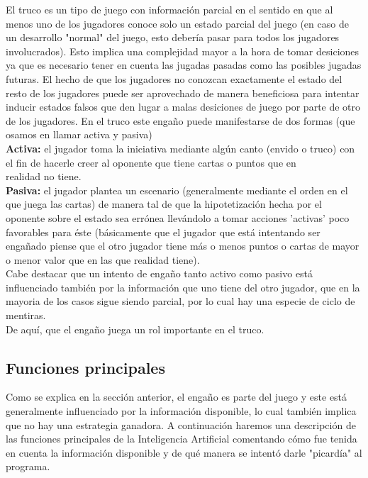 \documentclass[12pt,a4paper]{article}
\begin{document}
El truco es un tipo de juego con informaci\'on parcial en el sentido en que al menos uno de los jugadores
conoce solo un estado parcial del juego (en caso de un desarrollo "normal" del juego, esto deber\'ia 
pasar para todos los jugadores involucrados). Esto implica una complejidad mayor a la hora de tomar desiciones
ya que es necesario tener en cuenta las jugadas pasadas como las posibles jugadas futuras. 
El hecho de que los jugadores no conozcan exactamente el estado del resto de los jugadores puede ser aprovechado
de manera beneficiosa para intentar inducir estados falsos que den lugar a malas desiciones de juego 
por parte de otro de los jugadores. En el truco este enga\~no puede manifestarse de dos formas (que osamos en llamar
activa y pasiva)\\
\textbf{Activa:} el jugador toma la iniciativa mediante alg\'un canto (envido o truco) con el fin de hacerle creer al oponente que tiene
cartas o puntos que en \\ realidad no tiene.\\
\textbf{Pasiva:} el jugador plantea un escenario (generalmente mediante el orden en el que juega las cartas) de manera tal de que 
la hipotetizaci\'on hecha por el oponente sobre el estado sea err\'onea llev\'andolo a tomar acciones 'activas' poco favorables para 
\'este (b\'asicamente que el jugador que est\'a intentando ser enga\~nado piense que el otro jugador tiene m\'as o menos puntos o cartas de 
mayor o menor valor que en las que realidad tiene).\\
Cabe destacar que un intento de enga\~no tanto activo como pasivo est\'a influenciado tambi\'en por la informaci\'on que uno tiene del otro jugador,
que en la mayoria de los casos sigue siendo parcial,  por lo cual hay una especie de ciclo de mentiras.\\
De aqu\'i, que el enga\~no juega un rol importante en el truco.

\subsection{Funciones principales}
Como se explica en la secci\'on anterior, el enga\~no es parte del juego y este est\'a generalmente influenciado por
la informaci\'on disponible, lo cual tambi\'en implica que no hay una estrategia ganadora. 
A continuaci\'on haremos una descripci\'on de las funciones principales de la Inteligencia Artificial comentando c\'omo fue tenida en cuenta la 
informaci\'on disponible y de qu\'e manera se intent\'o darle "picard\'ia" al programa.
\end{document}
